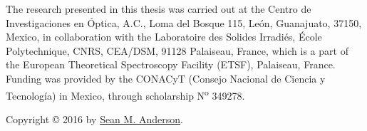 \begin{titlingpage}
\null
\vfill
\parbox{0.7\textwidth}{
The research presented in this thesis was carried out at the Centro de
Investigaciones en \'Optica, A.C., Loma del Bosque 115, Le\'on, Guanajuato,
37150, Mexico, in collaboration with the Laboratoire des Solides Irradi\'es,
\'Ecole Polytechnique, CNRS, CEA/DSM, 91128 Palaiseau, France, which is a part
of the European Theoretical Spectroscopy Facility (ETSF), Palaiseau, France.
Funding was provided by the CONACyT (Consejo Nacional de Ciencia y Tecnolog\'ia)
in Mexico, through scholarship N\textsuperscript{o} 349278.

\vspace{1cm}

Copyright {\copyright{}} 2016 by 
\href{mailto:sean.martin.anderson@gmail.com}{Sean M. Anderson}.
}
\end{titlingpage}
